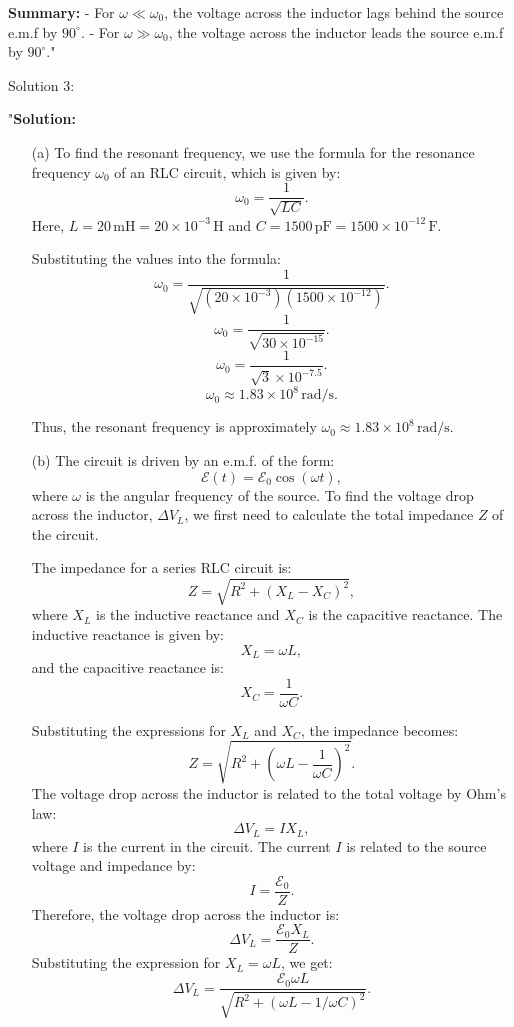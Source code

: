 \textbf{Summary:}
- For $\omega \ll \omega_0$, the voltage across the inductor lags behind the source e.m.f by $90^\circ$.
- For $\omega \gg \omega_0$, the voltage across the inductor leads the source e.m.f by $90^\circ$."

Solution 3:

"\textbf{Solution:}

\begin{enumerate}
    \item[(a)] To find the resonant frequency, we use the formula for the resonance frequency $\omega_0$ of an RLC circuit, which is given by:
    \[
    \omega_0 = \frac{1}{\sqrt{LC}}.
    \]
    Here, $L = 20\,\mathrm{mH} = 20 \times 10^{-3}\,\mathrm{H}$ and $C = 1500\,\mathrm{pF} = 1500 \times 10^{-12}\,\mathrm{F}$.

    Substituting the values into the formula:
    \[
    \omega_0 = \frac{1}{\sqrt{(20 \times 10^{-3})(1500 \times 10^{-12})}}.
    \]
    \[
    \omega_0 = \frac{1}{\sqrt{30 \times 10^{-15}}}.
    \]
    \[
    \omega_0 = \frac{1}{\sqrt{3} \times 10^{-7.5}}.
    \]
    \[
    \omega_0 \approx 1.83 \times 10^8 \, \mathrm{rad/s}.
    \]
    
    Thus, the resonant frequency is approximately $\omega_0 \approx 1.83 \times 10^8 \, \mathrm{rad/s}$.

    \item[(b)] The circuit is driven by an e.m.f. of the form:
    \[
    \mathcal{E}(t) = \mathcal{E}_0 \cos(\omega t),
    \]
    where $\omega$ is the angular frequency of the source. To find the voltage drop across the inductor, $\Delta V_L$, we first need to calculate the total impedance $Z$ of the circuit.

    The impedance for a series RLC circuit is:
    \[
    Z = \sqrt{R^2 + (X_L - X_C)^2},
    \]
    where $X_L$ is the inductive reactance and $X_C$ is the capacitive reactance. The inductive reactance is given by:
    \[
    X_L = \omega L,
    \]
    and the capacitive reactance is:
    \[
    X_C = \frac{1}{\omega C}.
    \]

    Substituting the expressions for $X_L$ and $X_C$, the impedance becomes:
    \[
    Z = \sqrt{R^2 + \left( \omega L - \frac{1}{\omega C} \right)^2}.
    \]
    The voltage drop across the inductor is related to the total voltage by Ohm’s law:
    \[
    \Delta V_L = I X_L,
    \]
    where $I$ is the current in the circuit. The current $I$ is related to the source voltage and impedance by:
    \[
    I = \frac{\mathcal{E}_0}{Z}.
    \]
    Therefore, the voltage drop across the inductor is:
    \[
    \Delta V_L = \frac{\mathcal{E}_0 X_L}{Z}.
    \]
    Substituting the expression for $X_L = \omega L$, we get:
    \[
    \Delta V_L = \frac{\mathcal{E}_0 \omega L}{\sqrt{R^2 + (\omega L - 1/\omega C)^2}}.
    \]


\end{enumerate}
